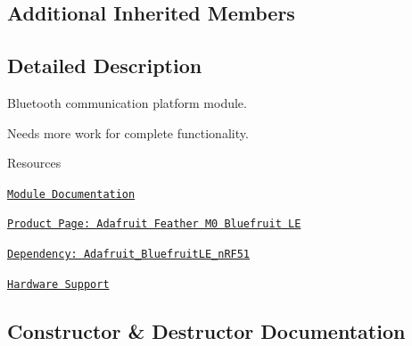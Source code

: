 \subsection*{Additional Inherited Members}


\subsection{Detailed Description}
Bluetooth communication platform module. 

Needs more work for complete functionality.

\begin{DoxyParagraph}{Resources}

\begin{DoxyItemize}
\item \href{https://openslab-osu.github.io/Loom/html/class_loom___bluetooth.html}{\tt Module Documentation}
\item \href{https://www.adafruit.com/product/2995}{\tt Product Page\+: Adafruit Feather M0 Bluefruit LE}
\item \href{https://github.com/adafruit/Adafruit_BluefruitLE_nRF51}{\tt Dependency\+: Adafruit\+\_\+\+Bluefruit\+L\+E\+\_\+n\+R\+F51}
\item \href{https://github.com/OPEnSLab-OSU/Loom/wiki/Hardware-Support#bluetooth}{\tt Hardware Support} 
\end{DoxyItemize}
\end{DoxyParagraph}


\subsection{Constructor \& Destructor Documentation}
